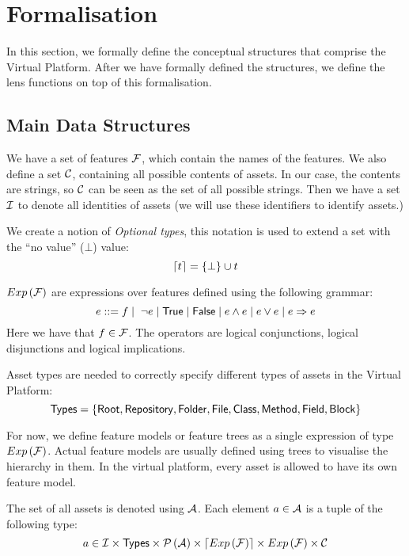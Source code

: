 \chapter{Formalisation}\label{sec:vp:formalisation}
In this section, we formally define the conceptual structures that comprise the
Virtual Platform. After we have formally defined the structures, we define the
lens functions on top of this formalisation.

\section{Main Data Structures}
We have a set of features \(\mathcal{F}\), which contain the names of the
features. We also define a set \(\mathcal{C}\), containing all possible
contents of assets. In our case, the contents are strings, so \(\mathcal{C}\)
can be seen as the set of all possible strings. Then we have a
set \(\mathcal{I}\) to denote all identities of assets (we will use these identifiers to
identify assets.)

\noindent
We create a notion of \emph{Optional types}, this notation is used to extend a set
with the ``no value'' (\( \bot \)) value:
\[
  \lceil t \rceil = \left\{ \bot \right\} \cup t
\]

\noindent
\( Exp \left( \mathcal{F} \right) \) are expressions over features defined using the
following grammar:
\[
  e ::= f \mid \hspace*{1mm} \neg e \mid {\sf True} \mid {\sf False} \mid {e}\land{e} \mid e \lor e \mid e \Rightarrow e
\]
Here we have that \( f \in \mathcal{F} \). The operators are logical conjunctions,
logical disjunctions and logical implications.

\noindent
Asset types are needed to correctly specify different types of assets in the
Virtual Platform:
\[
  {\sf Types} = \left\{ {\sf Root} , {\sf Repository} , {\sf Folder} , {\sf File} , {\sf Class} , {\sf Method} , {\sf Field} , {\sf Block} \right\}
\]

For now, we define feature models or feature trees as a single expression
of type \(Exp \left( \mathcal{F} \right)\). Actual feature models are usually defined
using trees to visualise the hierarchy in them. In the virtual platform, every
asset is allowed to have its own feature model.

\noindent
The set of all assets is denoted using \( \mathcal{A} \). Each element 
\(a \in \mathcal{A} \) is a tuple of the following type:
\[
  a \in \mathcal{I} \times {\sf Types} \times \mathcal{P} \left(\mathcal{A}\right) \times \lceil Exp \left( \mathcal{F} \right) \rceil \times Exp \left( \mathcal{F} \right) \times \mathcal{C}
\]

